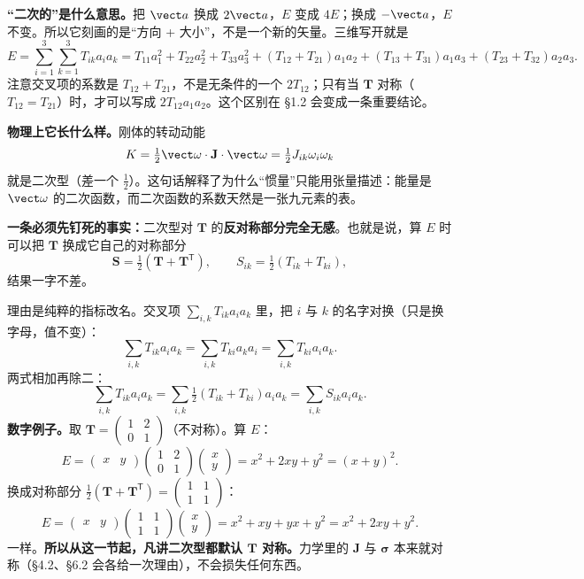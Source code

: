 \documentclass[11pt]{ctexart}
\newcommand{\ten}[1]{\mathbf{#1}}
\let\origsubhdr\subhdr
\renewcommand{\subhdr}[1]{\par\needspace{3\baselineskip}\origsubhdr{#1}}
\begin{document}
\textbf{“二次的”是什么意思。}把 $\vect a$ 换成 $2\vect a$，$E$ 变成 $4E$；换成 $-\vect a$，$E$ 不变。所以它刻画的是“方向 + 大小”，不是一个新的矢量。三维写开就是
\[
E=\sum_{i=1}^{3}\sum_{k=1}^{3}T_{ik}a_ia_k
=T_{11}a_1^2+T_{22}a_2^2+T_{33}a_3^2
+(T_{12}+T_{21})a_1a_2+(T_{13}+T_{31})a_1a_3+(T_{23}+T_{32})a_2a_3 .
\]
注意交叉项的系数是 $T_{12}+T_{21}$，不是无条件的一个 $2T_{12}$；只有当 $\ten T$ 对称（$T_{12}=T_{21}$）时，才可以写成 $2T_{12}a_1a_2$。这个区别在 §1.2 会变成一条重要结论。

\textbf{物理上它长什么样。}刚体的转动动能
\[
K=\tfrac12\vect\omega\cdot\ten J\cdot\vect\omega=\tfrac12J_{ik}\omega_i\omega_k
\]
就是二次型（差一个 $\tfrac12$）。这句话解释了为什么“惯量”只能用张量描述：能量是 $\vect\omega$ 的二次函数，而二次函数的系数天然是一张九元素的表。


\textbf{一条必须先钉死的事实：}二次型对 $\ten T$ 的\textbf{反对称部分完全无感}。也就是说，算 $E$ 时可以把 $\ten T$ 换成它自己的对称部分
\[
\ten S=\tfrac12(\ten T+\ten T^{\mathsf T}),\qquad S_{ik}=\tfrac12(T_{ik}+T_{ki}),
\]
结果一字不差。

理由是纯粹的指标改名。交叉项 $\sum_{i,k}T_{ik}a_ia_k$ 里，把 $i$ 与 $k$ 的名字对换（只是换字母，值不变）：
\[
\sum_{i,k}T_{ik}a_ia_k=\sum_{i,k}T_{ki}a_ka_i=\sum_{i,k}T_{ki}a_ia_k .
\]
两式相加再除二：
\[
\sum_{i,k}T_{ik}a_ia_k
=\sum_{i,k}\tfrac12(T_{ik}+T_{ki})a_ia_k
=\sum_{i,k}S_{ik}a_ia_k .
\]
\textbf{数字例子。}取 $\ten T=\begin{pmatrix}1&2\\0&1\end{pmatrix}$（不对称）。算 $E$：
\[
E=\begin{pmatrix}x&y\end{pmatrix}\begin{pmatrix}1&2\\0&1\end{pmatrix}\begin{pmatrix}x\\y\end{pmatrix}
=x^2+2xy+y^2=(x+y)^2 .
\]
换成对称部分 $\tfrac12(\ten T+\ten T^{\mathsf T})=\begin{pmatrix}1&1\\1&1\end{pmatrix}$：
\[
E=\begin{pmatrix}x&y\end{pmatrix}\begin{pmatrix}1&1\\1&1\end{pmatrix}\begin{pmatrix}x\\y\end{pmatrix}=x^2+xy+yx+y^2=x^2+2xy+y^2 .
\]
一样。\textbf{所以从这一节起，凡讲二次型都默认 $\ten T$ 对称。}力学里的 $\ten J$ 与 $\ten\sigma$ 本来就对称（§4.2、§6.2 会各给一次理由），不会损失任何东西。
\end{document}

